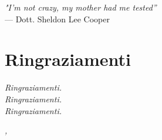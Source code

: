 
\cleardoublepage
{}
{}

\begin{flushright}{
    \slshape
    "I'm not crazy, my mother had me tested''} \\
  \medskip
  --- Dott. Sheldon Lee Cooper
\end{flushright}


\bigskip

\begingroup
\let\clearpage\relax
\let\cleardoublepage\relax
\let\cleardoublepage\relax

\chapter*{Ringraziamenti}

\noindent \textit{Ringraziamenti.}\\

\noindent \textit{Ringraziamenti.}\\

\noindent \textit{Ringraziamenti.}\\
\bigskip

\noindent\textit{\myLocation, \myTime}
\hfill \myName

\endgroup
